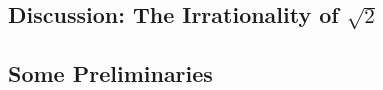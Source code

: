 \documentclass[12pt]{article}
\theoremstyle{definition}
\begin{document}
\subsection{Discussion: The Irrationality of \texorpdfstring{\( \sqrt{2} \)}{Root 2}} 






\subsection{Some Preliminaries}




  
\end{document}

